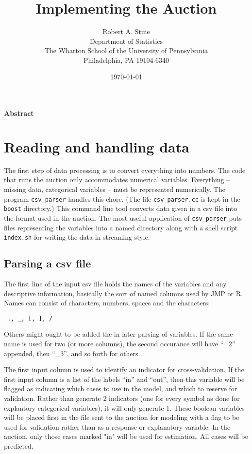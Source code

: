 \documentclass[12pt]{article}
\title{  
         Implementing the Auction
}
\author{
        Robert A. Stine                                      \\
        Department of Statistics                             \\
        The Wharton School of the University of Pennsylvania \\
        Philadelphia, PA 19104-6340                          \\
}
\date{\today}
\begin{document}
\maketitle 

\vspace{-0.5in} \centerline{\bf Abstract} 

\clearpage

\section*{Reading and handling data}  %

 The first step of data processing is to convert everything into numbers.  The
 code that runs the auction only accommodates numerical variables.  Everything
 -- missing data, categorical variables -- must be represented numerically.  The
 program {\tt csv\_parser} handles this chore.  (The file {\tt csv\_parser.cc}
 is kept in the {\tt boost} directory.)  This command line tool converts data
 given in a csv file into the format used in the auction.  The most useful
 application of {\tt csv\_parser} puts files representing the variables into a
 named directory along with a shell script {\tt index.sh} for writing the data
 in streaming style.


\subsection*{Parsing a csv file}

 The first line of the input csv file holds the names of the variables and any
 descriptive information, basically the sort of named columns used by JMP or R.
  Names can consist of characters, numbers, spaces and the characters:
 \begin{verbatim} ., _, [, ], / \end{verbatim}
 Others might ought to be added the in later parsing of variables.  If the same
 name is used for two (or more columns), the second occurance will have ``\_2''
 appended, then ``\_3'', and so forth for others.

 The first input column is used to identify an indicator for cross-validation.
  If the first input column is a list of the labels ``in'' and ``out'', then
 this variable will be flagged as indicating which cases to use in the model,
 and which to reserve for validation.  Rather than generate 2 indicators (one
 for every symbol as done for explantory categorical variables), it will only
 generate 1.  These boolean variables will be placed first in the file sent to
 the auction for modeling with a flag to be used for validation rather than as a
 response or explanatory variable.  In the auction, only those cases marked "in"
 will be used for estimation.  All cases will be predicted.
\end{document}
